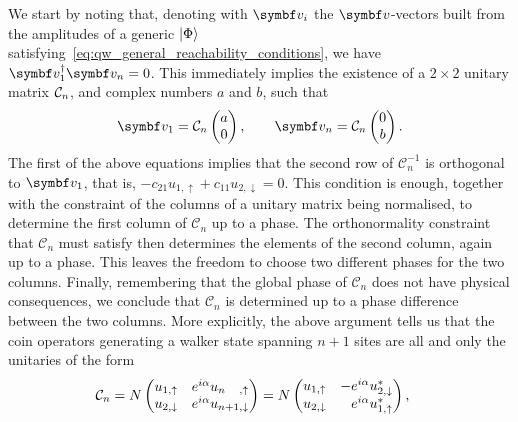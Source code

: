 We start by noting that,
denoting with $\bs v_i$ the $\bs v$-vectors built from the amplitudes of a generic $\ket{\Phi}$ satisfying~\cref{eq:qw_general_reachability_conditions}, we have $\bs v_1^\dagger \bs v_n = 0$.
This immediately implies the existence of a $2\times2$ unitary matrix ${\mathcal{C}}_n$, and complex numbers $a$ and $b$, such that
\begin{equation}
	\bs v_1 = \mathcal C_n
	\begin{pmatrix} a \\ 0 \end{pmatrix},
	\qquad
	\bs v_n = \mathcal C_n
	\begin{pmatrix} 0 \\ b \end{pmatrix}.
	\label{eq:equations_giving_C}
\end{equation}
The first of the above equations implies that the second row of $\mathcal C_n^{-1}$ is orthogonal to $\bs v_1$, that is,
$
	- c_{21} u_{1, \uparrow} + c_{11} u_{2, \downarrow} = 0.
$
This condition is enough, together with the constraint of the columns of a unitary matrix being normalised, to determine the first column of $\mathcal C_n$ up to a phase.
The orthonormality constraint that $\mathcal C_n$ must satisfy then determines the elements of the second column, again up to a phase.
This leaves the freedom to choose two different phases for the two columns.
Finally, remembering that the global phase of $\mathcal C_n$ does not have physical consequences, we conclude that $\mathcal C_n$ is determined up to a phase difference between the two columns.
More explicitly, the above argument tells us that the coin operators generating a walker state spanning $n+1$ sites are all and only the unitaries of the form
\begin{equation*}
\begin{aligned}
	\mathcal C_n
	&= N \begin{pmatrix}
		u_{1,\uparrow} & e^{i\alpha} u_{\makebox[0pt][l]{$\scriptstyle n$}\phantom{n+1},\uparrow} \\
		u_{2,\downarrow} & e^{i\alpha} u_{n+1,\downarrow}
	\end{pmatrix} = N \begin{pmatrix}
		u_{1,\uparrow} & -e^{i\alpha} u_{2,\downarrow}^* \\
		u_{2,\downarrow} & \phantom{-}e^{i\alpha} u_{1,\uparrow}^*
	\end{pmatrix},
\end{aligned}
\end{equation*}
